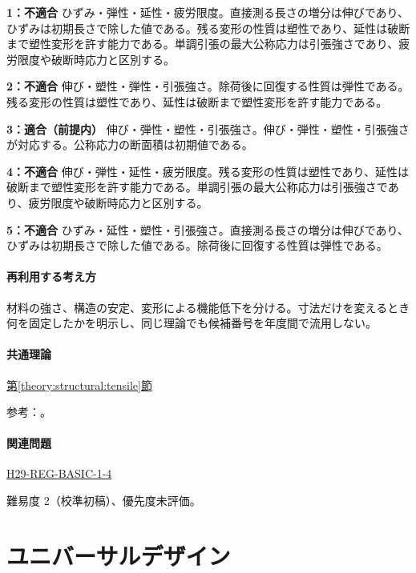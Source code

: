 \noindent\textbf{1：不適合} ひずみ・弾性・延性・疲労限度。直接測る長さの増分は伸びであり、ひずみは初期長さで除した値である。残る変形の性質は塑性であり、延性は破断まで塑性変形を許す能力である。単調引張の最大公称応力は引張強さであり、疲労限度や破断時応力と区別する。\par

\noindent\textbf{2：不適合} 伸び・塑性・弾性・引張強さ。除荷後に回復する性質は弾性である。残る変形の性質は塑性であり、延性は破断まで塑性変形を許す能力である。\par

\noindent\textbf{3：適合（前提内）} 伸び・弾性・塑性・引張強さ。伸び・弾性・塑性・引張強さが対応する。公称応力の断面積は初期値である。\par

\noindent\textbf{4：不適合} 伸び・弾性・延性・疲労限度。残る変形の性質は塑性であり、延性は破断まで塑性変形を許す能力である。単調引張の最大公称応力は引張強さであり、疲労限度や破断時応力と区別する。\par

\noindent\textbf{5：不適合} ひずみ・延性・塑性・引張強さ。直接測る長さの増分は伸びであり、ひずみは初期長さで除した値である。除荷後に回復する性質は弾性である。\par

\paragraph{再利用する考え方} 材料の強さ、構造の安定、変形による機能低下を分ける。寸法だけを変えるとき何を固定したかを明示し、同じ理論でも候補番号を年度間で流用しない。

\paragraph{共通理論} \hyperref[theory:structural:tensile]{第\ref*{theory:structural:tensile}節}

\par 参考：\cite{struct_mit_beam,struct_mit_buckling,struct_mlit_limit}。

\paragraph{関連問題} \hyperref[q:h29-reg-basic-1-4]{H29-REG-BASIC-1-4}

\par 難易度 2（校準初稿）、優先度未評価。

\section{ユニバーサルデザイン}

